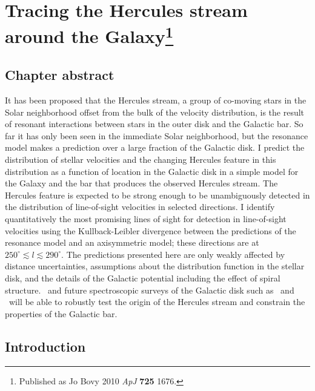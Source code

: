 \chapter[Tracing the Hercules streams around the Galaxy]{Tracing the Hercules stream around the Galaxy\protect\footnote{Published as Jo Bovy 2010 \emph{ApJ} {\bf 725} 1676.}}

\section{Chapter abstract}
It has been proposed that the Hercules stream, a group of co-moving
stars in the Solar neighborhood offset from the bulk of the velocity
distribution, is the result of resonant interactions between stars in
the outer disk and the Galactic bar. So far it has only been seen in
the immediate Solar neighborhood, but the resonance model makes a
prediction over a large fraction of the Galactic disk. I predict the
distribution of stellar velocities and the changing Hercules feature
in this distribution as a function of location in the Galactic disk in
a simple model for the Galaxy and the bar that produces the observed
Hercules stream. The Hercules feature is expected to be strong enough
to be unambiguously detected in the distribution of line-of-sight
velocities in selected directions. I identify quantitatively the most
promising lines of sight for detection in line-of-sight velocities
using the Kullback-Leibler divergence between the predictions of the
resonance model and an axisymmetric model; these directions are at
$250^{\circ} \lesssim l \lesssim 290^{\circ}$. The predictions
presented here are only weakly affected by distance uncertainties,
assumptions about the distribution function in the stellar disk, and
the details of the Galactic potential including the effect of spiral
structure. \Gaia\ and future spectroscopic surveys of the Galactic
disk such as \apogee\ and \hermes\ will be able to robustly test the
origin of the Hercules stream and constrain the properties of the
Galactic bar.


\section{Introduction}

